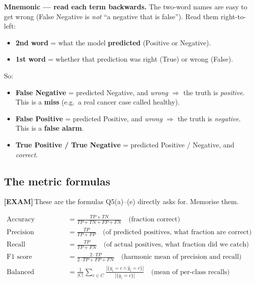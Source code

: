 \documentclass[11pt, a4paper]{article}
\newcommand{\examflag}{\textcolor{tipBd}{\textbf{[EXAM]}}\,}
\begin{document}
\begin{notebox}
\textbf{Mnemonic — read each term backwards.} The two-word names are easy to get wrong (False Negative is \emph{not} ``a negative that is false''). Read them right-to-left:
\begin{itemize}
  \item \textbf{2nd word} = what the model \textbf{predicted} (Positive or Negative).
  \item \textbf{1st word} = whether that prediction was right (True) or wrong (False).
\end{itemize}
So:
\begin{itemize}
  \item \textbf{False Negative} = predicted Negative, and \emph{wrong} $\Rightarrow$ the truth is \emph{positive}. This is a \textbf{miss} (e.g.\ a real cancer case called healthy).
  \item \textbf{False Positive} = predicted Positive, and \emph{wrong} $\Rightarrow$ the truth is \emph{negative}. This is a \textbf{false alarm}.
  \item \textbf{True Positive / True Negative} = predicted Positive / Negative, and \emph{correct}.
\end{itemize}
\end{notebox}

\subsection{The metric formulas}

\examflag{}These are the formulas Q5(a)--(e) directly asks for. Memorise them.

\begin{defbox}
\begin{align*}
\text{Accuracy} &= \frac{TP + TN}{TP + TN + FP + FN} \quad\text{(fraction correct)} \\[0.4em]
\text{Precision} &= \frac{TP}{TP + FP} \quad\text{(of predicted positives, what fraction are correct)} \\[0.4em]
\text{Recall} &= \frac{TP}{TP + FN} \quad\text{(of actual positives, what fraction did we catch)} \\[0.4em]
\text{F1 score} &= \frac{2 \cdot TP}{2 \cdot TP + FP + FN} \quad\text{(harmonic mean of precision and recall)} \\[0.4em]
\text{Balanced accuracy} &= \frac{1}{|C|}\sum_{c \in C}\frac{|\{y_i = c \wedge \hat y_i = c\}|}{|\{y_i = c\}|} \quad\text{(mean of per-class recalls)}
\end{align*}
\end{defbox}
\end{document}
